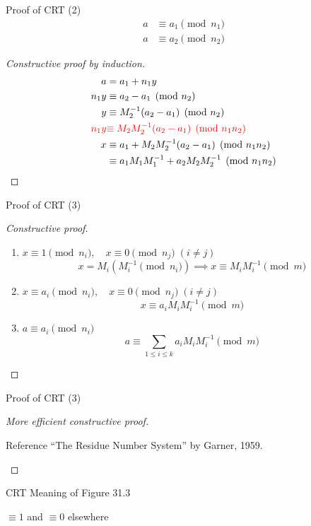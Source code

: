 \begin{frame}{Proof of CRT (2)}
  \begin{align*}
	a &\equiv a_1 \pmod{n_1} \\
	a &\equiv a_2 \pmod{n_2}
  \end{align*}

  \begin{proof}[Constructive proof by induction]
	\begin{align*}
	  a &= a_1 + n_1y \\
	  n_1y &\equiv a_2 - a_1 \pmod{n_2} \\
	  y &\equiv M_2^{-1}(a_2 - a_1) \pmod{n_2} \\
	  \textcolor{red}{n_1y} &\textcolor{red}{\equiv M_2M_2^{-1}(a_2 - a_1) \pmod{n_1n_2}} \\
	  x &\equiv a_1 + M_2M_2^{-1}(a_2 - a_1) \pmod{n_1n_2} \\
		&\equiv a_1M_1M_1^{-1} + a_2M_2M_2^{-1} \pmod{n_1n_2}
	\end{align*}
  \end{proof}
\end{frame}
\begin{frame}{Proof of CRT (3)}
  \begin{proof}[Constructive proof]
	\begin{enumerate}
	  \item $x \equiv 1 \pmod{n_i}, \quad x \equiv 0 \pmod{n_j}\; (i \neq j)$
		\[
		  x = M_i(M_i^{-1} \pmod{n_i}) \implies x \equiv M_iM_i^{-1} \pmod{m}
		\]
	  \item $x \equiv a_i \pmod{n_i}, \quad x \equiv 0 \pmod{n_j}\; (i \neq j)$
		\[
		  x \equiv a_i M_iM_i^{-1} \pmod{m}
		\]
	  \item $a \equiv a_i \pmod{n_i}$
		\[
		  a \equiv \sum_{1 \le i \le k} a_i M_iM_i^{-1} \pmod{m}
		\]
	\end{enumerate}
  \end{proof}
\end{frame}
\begin{frame}{Proof of CRT (3)}
  \begin{proof}[More efficient constructive proof]
	\begin{alertblock}{Reference}
	  ``The Residue Number System'' by Garner, 1959.
	\end{alertblock}
  \end{proof}
\end{frame}
\begin{frame}{CRT}
  Meaning of Figure 31.3

  $\equiv 1$ and $\equiv 0$ elsewhere
\end{frame}
